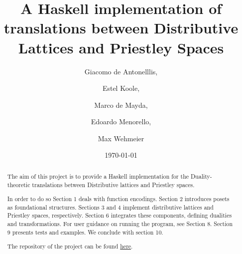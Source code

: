 \documentclass[12pt,a4paper]{article}
\title{A Haskell implementation of translations between Distributive Lattices and Priestley Spaces}
\author{Giacomo de Antonelllis, \and Estel Koole, \and Marco de Mayda, \and  Edoardo Menorello, \and  Max Wehmeier}
\date{\today}
\begin{document}
\maketitle

\begin{abstract}

The aim of this project is to provide a Haskell implementation for the Duality-theoretic translations between Distributive lattices and Priestley spaces.

In order to do so Section 1 deals with function encodings. Section 2 introduces posets as foundational structures. Sections 3 and 4 implement distributive lattices and Priestley spaces, respectively. Section 6 integrates these components, defining dualities and transformations. 
For user guidance on running the program, see Section 8. Section 9 presents tests and examples. We conclude with section 10.

The repository of the project can be found \href{https://github.com/maxwehmi/functional-duality}{here}.
\end{abstract}

\clearpage
\setcounter{tocdepth}{2} 
\tableofcontents

\clearpage




























\end{document}
